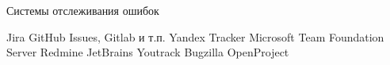 \documentclass{../../slides-style}
\begin{document}
    \begin{frame}{Системы отслеживания ошибок}
        \begin{outline}
            \1 Jira
            \1 GitHub Issues, Gitlab и т.п.
            \1 Yandex Tracker
            \1 Microsoft Team Foundation Server
            \1 Redmine
            \1 JetBrains Youtrack
            \1 Bugzilla
            \1 OpenProject
        \end{outline}
    \end{frame}
\end{document}
